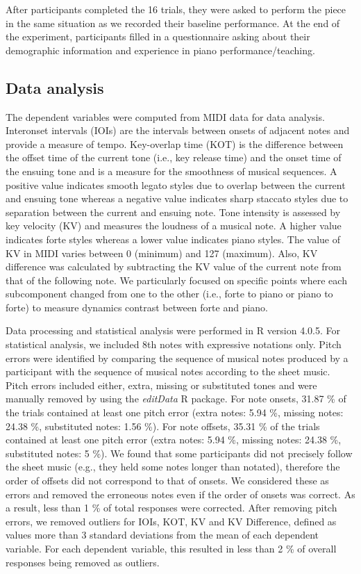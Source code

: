 \documentclass[
  man]{apa6}
\begin{document}
After participants completed the 16 trials, they were asked to perform the piece in the same situation as we recorded their baseline performance. At the end of the experiment, participants filled in a questionnaire asking about their demographic information and experience in piano performance/teaching.

\hypertarget{data-analysis}{%
\subsection{Data analysis}\label{data-analysis}}

The dependent variables were computed from MIDI data for data analysis. Interonset intervals (IOIs) are the intervals between onsets of adjacent notes and provide a measure of tempo. Key-overlap time (KOT) is the difference between the offset time of the current tone (i.e., key release time) and the onset time of the ensuing tone and is a measure for the smoothness of musical sequences. A positive value indicates smooth legato styles due to overlap between the current and ensuing tone whereas a negative value indicates sharp staccato styles due to separation between the current and ensuing note. Tone intensity is assessed by key velocity (KV) and measures the loudness of a musical note. A higher value indicates forte styles whereas a lower value indicates piano styles. The value of KV in MIDI varies between 0 (minimum) and 127 (maximum). Also, KV difference was calculated by subtracting the KV value of the current note from that of the following note. We particularly focused on specific points where each subcomponent changed from one to the other (i.e., forte to piano or piano to forte) to measure dynamics contrast between forte and piano.

Data processing and statistical analysis were performed in R version 4.0.5. For statistical analysis, we included 8th notes with expressive notations only. Pitch errors were identified by comparing the sequence of musical notes produced by a participant with the sequence of musical notes according to the sheet music. Pitch errors included either, extra, missing or substituted tones and were manually removed by using the \emph{editData} R package. For note onsets, 31.87 \% of the trials contained at least one pitch error (extra notes: 5.94 \%, missing notes: 24.38 \%, substituted notes: 1.56 \%). For note offsets, 35.31 \% of the trials contained at least one pitch error (extra notes: 5.94 \%, missing notes: 24.38 \%, substituted notes: 5 \%). We found that some participants did not precisely follow the sheet music (e.g., they held some notes longer than notated), therefore the order of offsets did not correspond to that of onsets. We considered these as errors and removed the erroneous notes even if the order of onsets was correct. As a result, less than 1 \% of total responses were corrected. After removing pitch errors, we removed outliers for IOIs, KOT, KV and KV Difference, defined as values more than 3 standard deviations from the mean of each dependent variable. For each dependent variable, this resulted in less than 2 \% of overall responses being removed as outliers.
\end{document}
